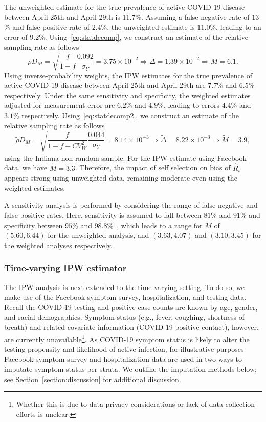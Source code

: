 \documentclass[11pt]{amsart}
\numberwithin{equation}{section}
\theoremstyle{plain}
\begin{document}
The unweighted estimate for the true prevalence of active COVID-19 disease between April 25th and April 29th is 11.7\%.  Assuming a false negative rate of $13$\% and false positive rate of $2.4$\%, the unweighted estimate is $11.0$\%, leading to an error of $9.2$\%.  Using~\eqref{eq:statdecomp}, we construct an estimate of the relative sampling rate as follows
\begin{equation*}
\rho D_M = \sqrt{\frac{f}{1-f}} \frac{\text{0.092}}{\sigma_Y} = 3.75 \times 10^{-2} \Rightarrow \Delta = 1.39 \times 10^{-2} \Rightarrow M = 6.1.
\end{equation*}
Using inverse-probability weights, the IPW estimates for the true prevalence of active COVID-19 disease between April 25th and April 29th are $7.7$\% and $6.5\%$ respectively.  Under the same sensitivity and specificity, the weighted estimates adjusted for measurement-error are $6.2$\% and $4.9$\%, leading to errors $4.4$\% and $3.1$\% respectively.  Using~\eqref{eq:statdecomp2}, we construct an estimate of the relative sampling rate as follows
\begin{equation*}
\tilde \rho D_M = \sqrt{\frac{f}{1-f+CV_W^2}} \frac{\text{0.044}}{\sigma_Y} = 8.14 \times 10^{-3} \Rightarrow \tilde \Delta = 8.22 \times 10^{-3}  \Rightarrow \tilde M = 3.9,
\end{equation*}
using the Indiana non-random sample.  For the IPW estimate using Facebook data, we have $\tilde M = 3.3$. Therefore, the impact of self selection on bias of $\hat R_t$ appears strong using unweighted data, remaining moderate even using the weighted estimates.

A sensitivity analysis is performed by considering the range of false negative and false positive rates.  Here, sensitivity is assumed to fall between $81$\% and $91$\% and specificity between $95$\% and $98.8$\%~\cite{Katz2020}, which leads to a range for $M$ of $(5.60, 6.44)$ for the unweighted analysis, and $(3.63,4.07)$ and $(3.10, 3.45)$ for the weighted analyses respectively.

\subsubsection{Time-varying IPW estimator}
\label{section:tvipw}

The IPW analysis is next extended to the time-varying setting.  To do so, we make use of the Facebook symptom survey, hospitalization, and testing data.  Recall the COVID-19 testing and positive case counts are known by age, gender, and racial demographics. Symptom status (e.g., fever, coughing, shortness of breath) and related covariate information (COVID-19 positive contact), however, are currently unavailable\footnote{Whether this is due to data privacy considerations or lack of data collection efforts is unclear.}.  As COVID-19 symptom status is likely to alter the testing propensity and likelihood of active infection, for illustrative purposes Facebook symptom survey and hospitalization data are used in two ways to imputate symptom status per strata. We outline the imputation methods below; see Section~\ref{section:discussion} for additional discussion.
\end{document}
